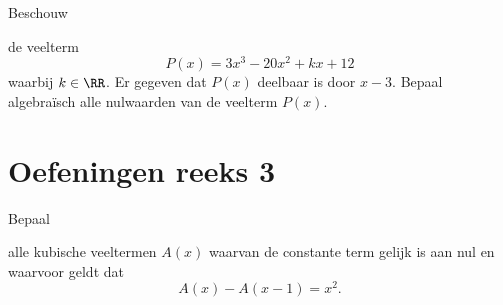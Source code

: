\documentclass{ximera}
\begin{document}
\begin{Oefening}\setcounter{enumi}{8}
\hypertarget{oef4.8}{Beschouw} de veelterm
\[
P(x) = 3x^3-20x^2+kx+12
\]
waarbij $k \in \RR$. Er gegeven dat $P(x)$ deelbaar is door $x-3$. Bepaal algebra\"isch alle nulwaarden van de veelterm $P(x)$.
\end{Oefening}

\section*{Oefeningen reeks 3}

\begin{Oefening}\setcounter{enumi}{9}
\hypertarget{oef4.9}{Bepaal} alle kubische veeltermen $A(x)$ waarvan de constante term gelijk is aan nul en waarvoor geldt dat
\[
A(x) - A(x-1) = x^2.
\]
\end{Oefening}
\end{document}

